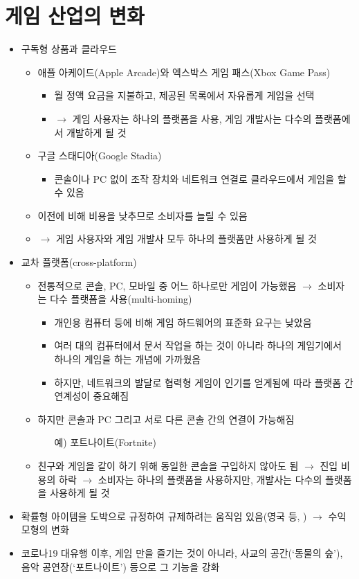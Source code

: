 \section{게임 산업의 변화}
\begin{itemize}
\item 구독형 상품과 클라우드 \citep{Plante:2021uu, Lai:2019wk}
	\begin{itemize}
	\item 애플 아케이드(Apple Arcade)와 엑스박스 게임 패스(Xbox Game Pass)
		\begin{itemize}
		\item 월 정액 요금을 지불하고, 제공된 목록에서 자유롭게 게임을 선택
		\item $\rightarrow$ 게임 사용자는 하나의 플랫폼을 사용, 게임 개발사는 다수의 플랫폼에서 개발하게 될 것
		\end{itemize}
	\item 구글 스태디아(Google Stadia)
		\begin{itemize}
		\item 콘솔이나 PC 없이 조작 장치와 네트워크 연결로 클라우드에서 게임을 할 수 있음
		\end{itemize}
	\item 이전에 비해 비용을 낮추므로 소비자를 늘릴 수 있음
	\item $\rightarrow$ 게임 사용자와 게임 개발사 모두 하나의 플랫폼만 사용하게 될 것
	\end{itemize}
\item 교차 플랫폼(cross-platform) \citep{Lai:2019wk}
	\begin{itemize}
	\item 전통적으로 콘솔, PC, 모바일 중 어느 하나로만 게임이 가능했음 $\rightarrow$ 소비자는 다수 플랫폼을 사용(multi-homing)
		\begin{itemize}
		\item 개인용 컴퓨터 등에 비해 게임 하드웨어의 표준화 요구는 낮았음
		\item 여러 대의 컴퓨터에서 문서 작업을 하는 것이 아니라 하나의 게임기에서 하나의 게임을 하는 개념에 가까웠음
		\item 하지만, 네트워크의 발달로 협력형 게임이 인기를 얻게됨에 따라 플랫폼 간 연계성이 중요해짐
		\end{itemize}
	\item 하지만 콘솔과 PC 그리고 서로 다른 콘솔 간의 연결이 가능해짐
		\begin{itemize}
		\item[예)] 포트나이트(Fortnite) 
		\end{itemize}
	\item 친구와 게임을 같이 하기 위해 동일한 콘솔을 구입하지 않아도 됨 $\rightarrow$ 진입 비용의 하락 $\rightarrow$ 소비자는 하나의 플랫폼을 사용하지만, 개발사는 다수의 플랫폼을 사용하게 될 것
	\end{itemize}
\item 확률형 아이템을 도박으로 규정하여 규제하려는 움직임 있음(영국 등, \cite{Davies:2020wn}) $\rightarrow$ 수익 모형의 변화
\item 코로나19 대유행 이후, 게임 만을 즐기는 것이 아니라, 사교의 공간(`동물의 숲'), 음악 공연장(`포트나이트') 등으로 그 기능을 강화 \citep{Slotkin:2020tq}	
\end{itemize}

